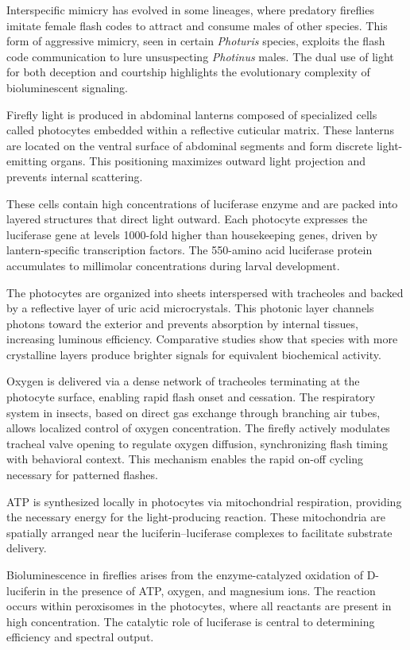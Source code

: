 Interspecific mimicry has evolved in some lineages, where predatory fireflies imitate female flash codes to attract and consume males of other species. This form of aggressive mimicry, seen in certain \emph{Photuris} species, exploits the flash code communication to lure unsuspecting \emph{Photinus} males. The dual use of light for both deception and courtship highlights the evolutionary complexity of bioluminescent signaling.

Firefly light is produced in abdominal lanterns composed of specialized cells called photocytes embedded within a reflective cuticular matrix. These lanterns are located on the ventral surface of abdominal segments and form discrete light-emitting organs. This positioning maximizes outward light projection and prevents internal scattering.

These cells contain high concentrations of luciferase enzyme and are packed into layered structures that direct light outward. Each photocyte expresses the luciferase gene at levels 1000-fold higher than housekeeping genes, driven by lantern-specific transcription factors. The 550-amino acid luciferase protein accumulates to millimolar concentrations during larval development. 

The photocytes are organized into sheets interspersed with tracheoles and backed by a reflective layer of uric acid microcrystals. This photonic layer channels photons toward the exterior and prevents absorption by internal tissues, increasing luminous efficiency. Comparative studies show that species with more crystalline layers produce brighter signals for equivalent biochemical activity.

Oxygen is delivered via a dense network of tracheoles terminating at the photocyte surface, enabling rapid flash onset and cessation. The respiratory system in insects, based on direct gas exchange through branching air tubes, allows localized control of oxygen concentration. The firefly actively modulates tracheal valve opening to regulate oxygen diffusion, synchronizing flash timing with behavioral context. This mechanism enables the rapid on-off cycling necessary for patterned flashes.

ATP is synthesized locally in photocytes via mitochondrial respiration, providing the necessary energy for the light-producing reaction. These mitochondria are spatially arranged near the luciferin–luciferase complexes to facilitate substrate delivery.

Bioluminescence in fireflies arises from the enzyme-catalyzed oxidation of D-luciferin in the presence of ATP, oxygen, and magnesium ions. The reaction occurs within peroxisomes in the photocytes, where all reactants are present in high concentration. The catalytic role of luciferase is central to determining efficiency and spectral output.

